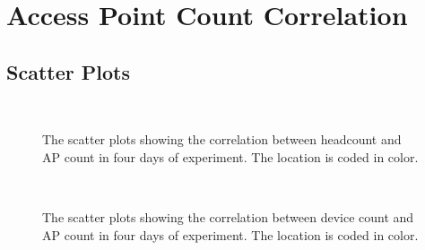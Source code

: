 
\chapter{Access Point Count Correlation}
\label{ch:appendix-sensor-readings}

\section{Scatter Plots} %
\label{sec:scatter-plots}
\begin{figure}[H]
  \begin{adjustwidth}{-1cm}{}
  \centering
  \\
  \end{adjustwidth}
  \caption[The scatter plots of the correlation between headcount and \ac{AP} count.]
  {The scatter plots showing the correlation between headcount and \ac{AP} count in four days of experiment. The location is coded in color.}
  \label{fig:ap-hc-scatterplot}
\end{figure}

\begin{figure}[H]
  \begin{adjustwidth}{-3cm}{}
  \centering
  \\
  \end{adjustwidth}
  \caption[The scatter plots of the correlation between device count and \ac{AP}.]
  {The scatter plots showing the correlation between device count and \ac{AP} count in four days of experiment. The location is coded in color.}
  \label{fig:ap-dc-scatterplot}
\end{figure}

